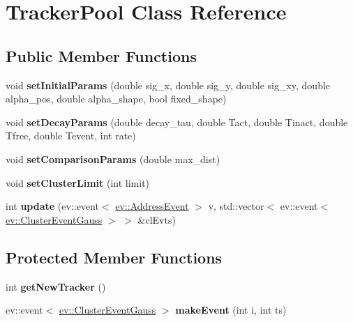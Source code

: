 \hypertarget{classTrackerPool}{}\section{Tracker\+Pool Class Reference}
\label{classTrackerPool}
\subsection*{Public Member Functions}
\begin{DoxyCompactItemize}
\item 
void {\bfseries set\+Initial\+Params} (double sig\+\_\+x, double sig\+\_\+y, double sig\+\_\+xy, double alpha\+\_\+pos, double alpha\+\_\+shape, bool fixed\+\_\+shape)\hypertarget{classTrackerPool_aba64099a18fc9b97eeb5b60f92ca849c}{}\label{classTrackerPool_aba64099a18fc9b97eeb5b60f92ca849c}

\item 
void {\bfseries set\+Decay\+Params} (double decay\+\_\+tau, double Tact, double Tinact, double Tfree, double Tevent, int rate)\hypertarget{classTrackerPool_aacfd7b8d8f8d47cf609e6e4ed64bbc1a}{}\label{classTrackerPool_aacfd7b8d8f8d47cf609e6e4ed64bbc1a}

\item 
void {\bfseries set\+Comparison\+Params} (double max\+\_\+dist)\hypertarget{classTrackerPool_a2ae5849c22bc24b688bd5ddf153e9e33}{}\label{classTrackerPool_a2ae5849c22bc24b688bd5ddf153e9e33}

\item 
void {\bfseries set\+Cluster\+Limit} (int limit)\hypertarget{classTrackerPool_a947f58bef9d46a290cb3ea6ec99d5fb8}{}\label{classTrackerPool_a947f58bef9d46a290cb3ea6ec99d5fb8}

\item 
int {\bfseries update} (ev\+::event$<$ \hyperlink{classev_1_1AddressEvent}{ev\+::\+Address\+Event} $>$ v, std\+::vector$<$ ev\+::event$<$ \hyperlink{classev_1_1ClusterEventGauss}{ev\+::\+Cluster\+Event\+Gauss} $>$ $>$ \&cl\+Evts)\hypertarget{classTrackerPool_ae64eee2fd11a6e3402cc94b12480b97a}{}\label{classTrackerPool_ae64eee2fd11a6e3402cc94b12480b97a}

\end{DoxyCompactItemize}
\subsection*{Protected Member Functions}
\begin{DoxyCompactItemize}
\item 
int {\bfseries get\+New\+Tracker} ()\hypertarget{classTrackerPool_afc17f68023420c6d43ac4b67afa3b14d}{}\label{classTrackerPool_afc17f68023420c6d43ac4b67afa3b14d}

\item 
ev\+::event$<$ \hyperlink{classev_1_1ClusterEventGauss}{ev\+::\+Cluster\+Event\+Gauss} $>$ {\bfseries make\+Event} (int i, int ts)\hypertarget{classTrackerPool_ab180f70f6ab8d8315ab38c37fed4507b}{}\label{classTrackerPool_ab180f70f6ab8d8315ab38c37fed4507b}

\end{DoxyCompactItemize}
